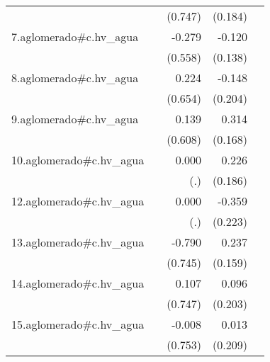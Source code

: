 {\begin{longtable}{l*{4}{D{.}{.}{-1}}}
            &                     &     (0.747)         &     (0.184)         &                     \\
\addlinespace
7.aglomerado#c.hv\_agua&                     &      -0.279         &      -0.120         &                     \\
            &                     &     (0.558)         &     (0.138)         &                     \\
\addlinespace
8.aglomerado#c.hv\_agua&                     &       0.224         &      -0.148         &                     \\
            &                     &     (0.654)         &     (0.204)         &                     \\
\addlinespace
9.aglomerado#c.hv\_agua&                     &       0.139         &       0.314         &                     \\
            &                     &     (0.608)         &     (0.168)         &                     \\
\addlinespace
10.aglomerado#c.hv\_agua&                     &       0.000         &       0.226         &                     \\
            &                     &         (.)         &     (0.186)         &                     \\
\addlinespace
12.aglomerado#c.hv\_agua&                     &       0.000         &      -0.359         &                     \\
            &                     &         (.)         &     (0.223)         &                     \\
\addlinespace
13.aglomerado#c.hv\_agua&                     &      -0.790         &       0.237         &                     \\
            &                     &     (0.745)         &     (0.159)         &                     \\
\addlinespace
14.aglomerado#c.hv\_agua&                     &       0.107         &       0.096         &                     \\
            &                     &     (0.747)         &     (0.203)         &                     \\
\addlinespace
15.aglomerado#c.hv\_agua&                     &      -0.008         &       0.013         &                     \\
            &                     &     (0.753)         &     (0.209)         &                     \\

\end{longtable}}
